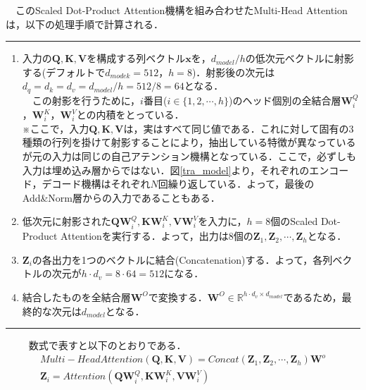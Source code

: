 \documentclass[a4j, 11pt]{jsarticle}
\numberwithin{equation}{section}
\begin{document}
　このScaled Dot-Product Attention機構を組み合わせたMulti-Head Attentionは，以下の処理手順で計算される．\\
\hrule height 0.3mm depth 0.3mm width 140mm
\begin{enumerate}
\item 入力の$\mathbf{Q}, \mathbf{K}, \mathbf{V}$を構成する列ベクトル$\mathbf{x}$を，$d_{model}/h$の低次元ベクトルに射影する(デフォルトで$d_{modek}=512$，$h=8$)．射影後の次元は$d_q = d_k = d_v = d_{model}/h = 512/8 = 64$となる．\\
　この射影を行うために，$i$番目($i\in\{1,  2, \cdots, h\}$)のヘッド個別の全結合層$\mathbf{W}_i^Q$，$\mathbf{W}_i^K$，$\mathbf{W}_i^V$との内積をとっている．\\
※ここで，入力$\mathbf{Q}, \mathbf{K}, \mathbf{V}$は，実はすべて同じ値である．これに対して固有の3種類の行列を掛けて射影することにより，抽出している特徴が異なっているが元の入力は同じの自己アテンション機構となっている．ここで，必ずしも入力は埋め込み層からではない．図\ref{tra_model}より，それぞれのエンコード，デコード機構はそれぞれ$N$回繰り返している．よって，最後のAdd\&Norm層からの入力であることもある．\\

\item 低次元に射影された$\mathbf{QW}_i^Q, \mathbf{KW}_i^K, \mathbf{VW}_i^V$を入力に，$h=8$個のScaled Dot-Product Attentionを実行する．よって，出力は8個の$\mathbf{Z}_1,\mathbf{Z}_2,\cdots, \mathbf{Z}_h$となる．\\

\item $\mathbf{Z}_i$の各出力を1つのベクトルに結合(Concatenation)する．よって，各列ベクトルの次元が$h\cdot d_v = 8\cdot 64 = 512$になる．\\

\item 結合したものを全結合層$\mathbf{W}^O$で変換する．$\mathbf{W}^O\in\mathbb{R}^{h\cdot d_v\times d_{model}}$であるため，最終的な次元は$d_{model}$となる．

\end{enumerate}
\hrule height 0.3mm depth 0.3mm width 140mm
\vspace{5mm}　
　数式で表すと以下のとおりである．\\
\begin{gather}
Multi-Head Attention(\mathbf{Q}, \mathbf{K}, \mathbf{V}) = Concat(\mathbf{Z}_1, \mathbf{Z}_2, \cdots, \mathbf{Z}_h)\mathbf{W}^o\\
\mathbf{Z}_i = Attention(\mathbf{QW}_i^Q, \mathbf{KW}_i^K, \mathbf{VW}_i^V)
\end{gather}　
\end{document}
